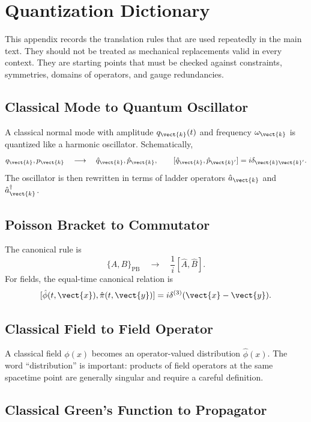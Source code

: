 \chapter{Quantization Dictionary}

\begin{remarkbox}
This appendix records the translation rules that are used repeatedly in the
main text. They should not be treated as mechanical replacements valid in every
context. They are starting points that must be checked against constraints,
symmetries, domains of operators, and gauge redundancies.
\end{remarkbox}

\section{Classical Mode to Quantum Oscillator}

A classical normal mode with amplitude \(q_{\vect{k}}(t)\) and frequency
\(\omega_{\vect{k}}\) is quantized like a harmonic oscillator. Schematically,
\[
    q_{\vect{k}},p_{\vect{k}}
    \quad \longrightarrow \quad
    \hat q_{\vect{k}},\hat p_{\vect{k}},
    \qquad
    [\hat q_{\vect{k}},\hat p_{\vect{k}'}]=i\delta_{\vect{k}\vect{k}'}.
\]
The oscillator is then rewritten in terms of ladder operators
\(\hat a_{\vect{k}}\) and \(\hat a_{\vect{k}}^\dagger\).

\section{Poisson Bracket to Commutator}

The canonical rule is
\[
    \{A,B\}_{\mathrm{PB}}
    \quad \longrightarrow \quad
    \frac{1}{i}[\hat A,\hat B].
\]
For fields, the equal-time canonical relation is
\[
    [\hat\phi(t,\vect{x}),\hat\pi(t,\vect{y})]
    = i\delta^{(3)}(\vect{x}-\vect{y}).
\]

\section{Classical Field to Field Operator}

A classical field \(\phi(x)\) becomes an operator-valued distribution
\(\hat\phi(x)\). The word ``distribution'' is important: products of field
operators at the same spacetime point are generally singular and require a
careful definition.

\section{Classical Green's Function to Propagator}

